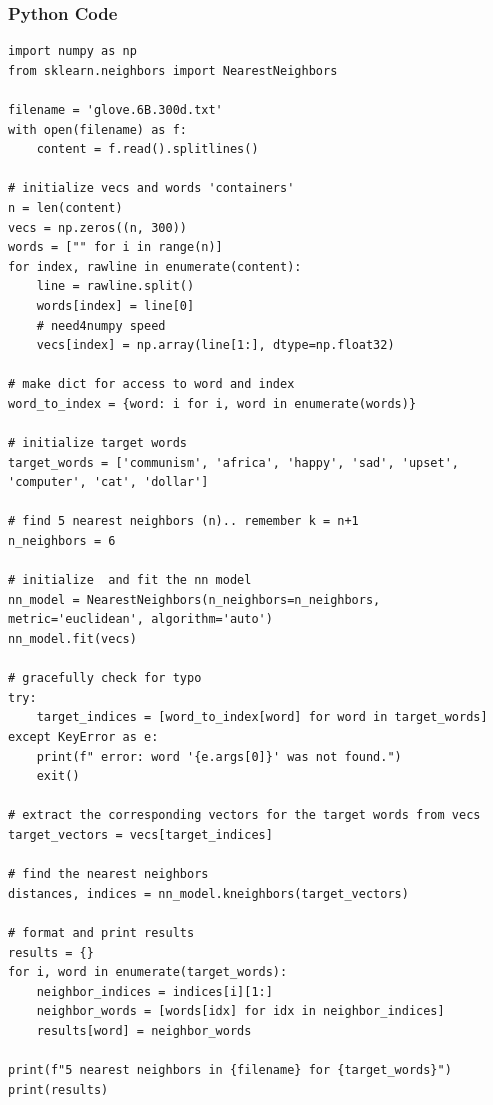 \documentclass{article}
\begin{document}
\subsubsection*{Python Code}
\begin{lstlisting}
import numpy as np
from sklearn.neighbors import NearestNeighbors

filename = 'glove.6B.300d.txt'
with open(filename) as f:
    content = f.read().splitlines()

# initialize vecs and words 'containers'
n = len(content)
vecs = np.zeros((n, 300))
words = ["" for i in range(n)] 
for index, rawline in enumerate(content):
    line = rawline.split()
    words[index] = line[0]
    # need4numpy speed
    vecs[index] = np.array(line[1:], dtype=np.float32)

# make dict for access to word and index
word_to_index = {word: i for i, word in enumerate(words)}

# initialize target words
target_words = ['communism', 'africa', 'happy', 'sad', 'upset', 'computer', 'cat', 'dollar']

# find 5 nearest neighbors (n).. remember k = n+1
n_neighbors = 6

# initialize  and fit the nn model
nn_model = NearestNeighbors(n_neighbors=n_neighbors, metric='euclidean', algorithm='auto')
nn_model.fit(vecs)

# gracefully check for typo
try:
    target_indices = [word_to_index[word] for word in target_words]
except KeyError as e:
    print(f" error: word '{e.args[0]}' was not found.")
    exit()

# extract the corresponding vectors for the target words from vecs
target_vectors = vecs[target_indices]

# find the nearest neighbors
distances, indices = nn_model.kneighbors(target_vectors)

# format and print results
results = {}
for i, word in enumerate(target_words):
    neighbor_indices = indices[i][1:]
    neighbor_words = [words[idx] for idx in neighbor_indices]
    results[word] = neighbor_words

print(f"5 nearest neighbors in {filename} for {target_words}")
print(results)

\end{lstlisting}
\end{document}
